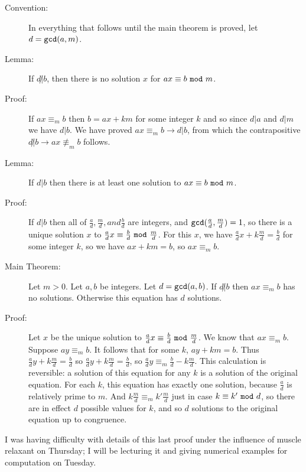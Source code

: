 \documentclass[12pt]{article}
\begin{document}
\begin{description}

\item[Convention:]  In everything that follows until the main theorem is proved, let $d={\tt gcd}(a,m)$.

\item[Lemma:]  If $d \not|b$, then there is no solution $x$ for $ax \equiv b \,\,{\tt mod}\,\, m$.

\item[Proof:]  If $ax \equiv_m b$ then $b = ax+km$ for some integer $k$ and so since $d|a$ and $d|m$ we have $d|b$.  We have proved $ax \equiv_m b \rightarrow d|b$, from which the contrapositive $d\not|b \rightarrow ax \not\equiv_m b$ follows.

\item[Lemma:]  If $d|b$ then there is at least one solution to $ax \equiv b \,\,{\tt mod}\,\, m$. 

\item[Proof:]  If $d|b$ then all of $\frac ad, \frac md, and \frac bd$ are integers, and ${\tt gcd}(\frac ad,\frac md)=1$, so there is a unique solution $x$ to
$\frac adx \equiv \frac bd \,\,{\tt mod}\,\, \frac md$.  For this $x$, we have $\frac adx + k\frac md = \frac bd$ for some integer $k$, so we have
$ax+km=b$, so $ax \equiv_m b$.

\item[Main Theorem:]  Let $m>0$.  Let $a,b$ be integers.  Let $d={\tt gcd}(a,b)$.  If $d \not|b$ then $ax \equiv_m b$ has no solutions.
Otherwise this equation has $d$ solutions.

\item[Proof:]  Let $x$ be the unique solution to $\frac adx \equiv \frac bd \,\,{\tt mod}\,\, \frac md$.  We know that $ax \equiv_m b$.
Suppose $ay \equiv_m b$.  It follows that for some $k$, $ay + km = b$.  Thus $\frac ady + k\frac md = \frac bd$ so $\frac ady + k\frac md = \frac bd$,
so $\frac ad y \equiv_m \frac bd - k\frac md$.  This calculation is reversible:  a solution of this equation for any $k$ is a solution of the original equation.
For each $k$, this equation has exactly one solution, because $\frac ad$ is relatively prime to $m$.  And $k\frac md \equiv_m k'\frac md$ just in case
$k \equiv k' \,\,{\tt mod}\,\, d$, so there are in effect $d$ possible values for $k$, and so $d$ solutions to the original equation up to congruence.

\end{description}

I was having difficulty with details of this last proof under the influence of muscle relaxant on Thursday;  I will be lecturing it and giving numerical examples for computation on Tuesday.
\end{document}

